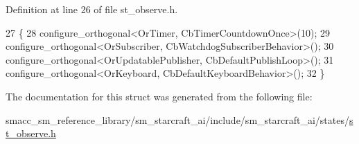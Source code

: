 Definition at line 26 of file st\+\_\+observe.\+h.


\begin{DoxyCode}
27     \{
28         configure\_orthogonal<OrTimer, CbTimerCountdownOnce>(10);
29         configure\_orthogonal<OrSubscriber, CbWatchdogSubscriberBehavior>();
30         configure\_orthogonal<OrUpdatablePublisher, CbDefaultPublishLoop>();
31         configure\_orthogonal<OrKeyboard, CbDefaultKeyboardBehavior>();
32     \}
\end{DoxyCode}


The documentation for this struct was generated from the following file\+:\begin{DoxyCompactItemize}
\item 
smacc\+\_\+sm\+\_\+reference\+\_\+library/sm\+\_\+starcraft\+\_\+ai/include/sm\+\_\+starcraft\+\_\+ai/states/\hyperlink{st__observe_8h}{st\+\_\+observe.\+h}\end{DoxyCompactItemize}
